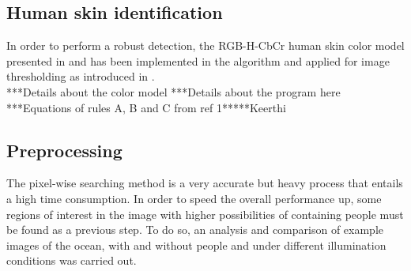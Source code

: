 \subsection{Human skin identification}
In order to perform a robust detection, the RGB-H-CbCr human skin color model presented in \cite{Ref:SkinColorModel} and \cite{Ref:SkinDetection} has been implemented in the algorithm and applied for image thresholding as introduced in \cite{Ref:SkinDetection}.\\
***Details about the color model
***Details about the program here
***Equations of rules A, B and C from ref 1*****Keerthi






\subsection{Preprocessing}
The pixel-wise searching method is a very accurate but heavy process that entails a high time consumption.
In order to speed the overall performance up, some regions of interest in the image with higher possibilities of containing people must be found as a previous step. To do so, an analysis and comparison of example images of the ocean, with and without people and under different illumination conditions was carried out.  

